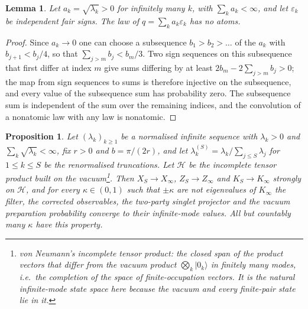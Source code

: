 \documentclass[11pt,a4paper]{article}
\newtheorem{proposition}{Proposition}
\newtheorem{lemma}{Lemma}
\newcommand{\ket}[1]{|#1\rangle}
\begin{document}
\begin{lemma}
\label{lem:nonatomic}
Let $a_k=\sqrt{\lambda_k}>0$ for infinitely many $k$, with $\sum_ka_k<\infty$, and let $\varepsilon_k$ be independent fair signs. The law of $q=\sum_ka_k\varepsilon_k$ has no atoms.
\end{lemma}
\begin{proof}
Since $a_k\to0$ one can choose a subsequence $b_1>b_2>\dots$ of the $a_k$ with $b_{j+1}<b_j/4$, so that $\sum_{j>m}b_j<b_m/3$. Two sign sequences on this subsequence that first differ at index $m$ give sums differing by at least $2b_m-2\sum_{j>m}b_j>0$; the map from sign sequences to sums is therefore injective on the subsequence, and every value of the subsequence sum has probability zero. The subsequence sum is independent of the sum over the remaining indices, and the convolution of a nonatomic law with any law is nonatomic.
\end{proof}
\begin{proposition}
\label{prop:infinite}
Let $(\lambda_k)_{k\ge1}$ be a normalised infinite sequence with $\lambda_k>0$ and $\sum_k\sqrt{\lambda_k}<\infty$, fix $r>0$ and $b=\pi/(2r)$, and let $\lambda^{(S)}_k=\lambda_k/\sum_{j\le S}\lambda_j$ for $1\le k\le S$ be the renormalised truncations. Let $\mathcal H$ be the incomplete tensor product built on the vacuum\footnote{von Neumann's incomplete tensor product: the closed span of the product vectors that differ from the vacuum product $\bigotimes_k\ket{0_k}$ in finitely many modes, i.e.\ the completion of the space of finite-occupation vectors. It is the natural infinite-mode state space here because the vacuum and every finite-pair state lie in it.}. Then $X_S\to X_\infty$, $Z_S\to Z_\infty$ and $K_S\to K_\infty$ strongly on $\mathcal H$, and for every $\kappa\in(0,1)$ such that $\pm\kappa$ are not eigenvalues of $K_\infty$ the filter, the corrected observables, the two-party singlet projector and the vacuum preparation probability converge to their infinite-mode values. All but countably many $\kappa$ have this property.
\end{proposition}
\end{document}
